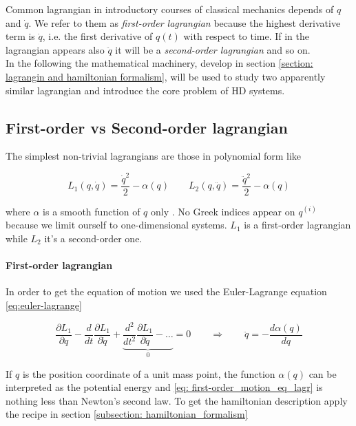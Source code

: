 Common lagrangian in introductory courses of classical mechanics depends of $q$
and $\dot{q}$. We refer to them as \emph{first-order lagrangian} because the
highest derivative term is $\dot{q}$, i.e. the first derivative of $q(t)$ with
respect to time. If in the lagrangian appears also $\ddot{q}$ it will be a
\emph{second-order lagrangian} and so on. \\

In the following the mathematical machinery, develop in section \ref{section:
lagrangin and hamiltonian formalism}, will be used to study two apparently
similar lagrangian and introduce the core problem of HD systems.

\subsection{First-order vs Second-order lagrangian}
The simplest non-trivial lagrangians are those in polynomial form like

\begin{equation*}
  L_1(q, \dot{q}) = \frac{\dot{q}^2}{2} - \alpha(q) \qquad
  L_2(q, \ddot{q}) = \frac{\ddot{q}^2}{2} - \alpha(q)
\end{equation*}

where $\alpha$ is a smooth function of $q$ only \cite{Chen13}. No Greek indices
appear on $q^{(i)}$ because we limit ourself to one-dimensional systems. $L_1$
is a first-order lagrangian while $L_2$ it's a second-order one.


\paragraph{First-order lagrangian} In order to get the equation of motion we
used the Euler-Lagrange equation \eqref{eq:euler-lagrange}

\begin{equation} \label{eq: first-order_motion_eq_lagr}
  \frac{\partial L_1}{\partial q} -
  \frac{d}{dt}\frac{\partial L_1}{\partial \dot{q}} +
  \underbrace{
  \frac{d^2}{dt^2}\frac{\partial L_1}{\partial \ddot{q}} - \ldots }_0 = 0
  \qquad \Rightarrow \qquad
  \ddot{q} = - \frac{d\alpha(q)}{dq}
\end{equation}

If $q$ is the position coordinate of a unit mass point, the function $\alpha(q)$
can be interpreted as the potential energy and \eqref{eq:
first-order_motion_eq_lagr} is nothing less than Newton's second law. To get the
hamiltonian description apply the recipe in section \ref{subsection:
hamiltonian_formalism}

